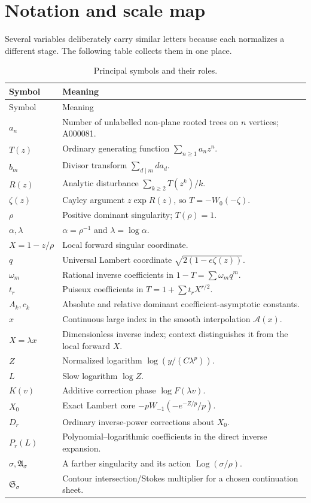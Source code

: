 \documentclass[11pt,a4paper,oneside,openany]{book}
\theoremstyle{definition}
\theoremstyle{remark}
\newcommand{\Action}{\mathfrak A}
\newcommand{\Stokes}{\mathfrak S}
\DeclareMathOperator{\Log}{Log}
\begin{document}
\chapter{Notation and scale map}
\label{app:notation}

Several variables deliberately carry similar letters because each normalizes a
different stage.  The following table collects them in one place.
\begin{longtable}{p{}p{}}
\caption{Principal symbols and their roles.}
\label{tab:notation}\\
\toprule
Symbol & Meaning\\
\midrule
\endfirsthead
\toprule
Symbol & Meaning\\
\midrule
\endhead
$a_n$ & Number of unlabelled non-plane rooted trees on $n$ vertices; A000081.\\
$T(z)$ & Ordinary generating function $\sum_{n\ge1}a_nz^n$.\\
$b_m$ & Divisor transform $\sum_{d\mid m}d a_d$.\\
$R(z)$ & Analytic disturbance $\sum_{k\ge2}T(z^k)/k$.\\
$\zeta(z)$ & Cayley argument $z\exp R(z)$, so $T=-W_0(-\zeta)$.\\
$\rho$ & Positive dominant singularity; $T(\rho)=1$.\\
$\alpha,\lambda$ & $\alpha=\rho^{-1}$ and $\lambda=\log\alpha$.\\
$X=1-z/\rho$ & Local forward singular coordinate.\\
$q$ & Universal Lambert coordinate $\sqrt{2(1-e\zeta(z))}$.\\
$\omega_m$ & Rational inverse coefficients in $1-T=\sum\omega_mq^m$.\\
$t_r$ & Puiseux coefficients in $T=1+\sum t_rX^{r/2}$.\\
$A_k,c_k$ & Absolute and relative dominant coefficient-asymptotic constants.\\
$x$ & Continuous large index in the smooth interpolation $\mathcal A(x)$.\\
$X=\lambda x$ & Dimensionless inverse index; context distinguishes it from the local forward $X$.\\
$Z$ & Normalized logarithm $\log(y/(C\lambda^p))$.\\
$L$ & Slow logarithm $\log Z$.\\
$K(v)$ & Additive correction phase $\log F(\lambda v)$.\\
$X_0$ & Exact Lambert core $-pW_{-1}(-e^{-Z/p}/p)$.\\
$D_r$ & Ordinary inverse-power corrections about $X_0$.\\
$P_r(L)$ & Polynomial--logarithmic coefficients in the direct inverse expansion.\\
$\sigma,\Action_\sigma$ & A farther singularity and its action $\Log(\sigma/\rho)$.\\
$\Stokes_\sigma$ & Contour intersection/Stokes multiplier for a chosen continuation sheet.\\
\bottomrule
\end{longtable}
\end{document}
